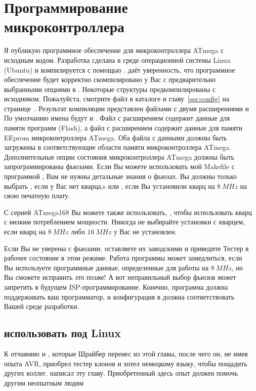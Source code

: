 \section{Программирование микроконтроллера}
Я публикую программное обеспечение для микроконтроллера ATmega с исходным кодом.
Разработка сделана в среде операционной системы Linux (Ubuntu) и компилируется с помощью .
 даёт уверенность, что программное обеспечение будет корректно скомпилировано
у Вас с предварительно выбранными опциями в .
Некоторые структуры предкомпилированы с исходником.
Пожалуйста, смотрите   файл в каталоге  
и главу~\ref{sec:config} на странице~\pageref{sec:config}.
Результат компиляции представлен файлами с двумя расширениями  и 
По умолчанию имена будут  и .
Файл с расширением  содержит данные для памяти программ (Flash), 
а файл с расширением  содержит данные для памяти EEprom  микроконтроллера ATmega.
Оба файла с данными должны быть загружены в соответствующие области памяти микроконтроллера ATmega.\\

Дополнительные опции состояния микроконтроллера ATmega должны быть запрограммированы фьюзами.
Если Вы можете использовать мой Makefile с программой  \cite{avrdude},
Вам не нужны детальные знания о фьюзах. 
Вы должны только выбрать  , если у Вас нет кварца,s
или  , если Вы установили кварц на \(8~MHz\) на свою печатную плату.

С серией ATmega168 Вы можете также использовать,  , 
чтобы использовать кварц с низким потреблением мощности.
Никогда не выбирайте установки с кварцем, если кварц на \(8~MHz\) либо \(16~MHz\) у Вас не установлен.

Если Вы не уверены с фьюзами, оставляете их заводскими и приведите Тестер в рабочее 
состояние в этом режиме.
Работа программы может замедлиться, если Вы используете программные данные,
определенные для работы на \(8~MHz\), но Вы сможете исправить это позже!
А вот неправильный выбор фьюзов может запретить в будущем ISP-программирование.
Конечно, программа  должна поддерживать ваш программатор, и конфигурация в  
должна соответствовать Вашей среде разработки.\\

\subsection{использовать под Linux}
\label{sec:linux}
К отчаянию и , которые Шрайбер перенес из этой главы, после чего он, не имея опыта AVR, приобрел тестер клонов и хотел  немецкому языку, чтобы пощадить других коллег. написал эту главу.
Приобретенный здесь опыт должен помочь другим  неопытным людям
 

